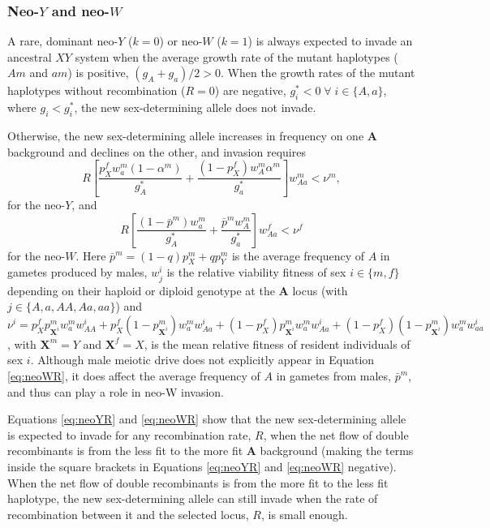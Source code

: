 \documentclass[12pt]{article}
\begin{document}
\subsubsection*{Neo-$Y$ and neo-$W$}

A rare, dominant neo-$Y$ ($k=0$) or neo-$W$ ($k=1$) is always expected to invade an ancestral $XY$ system when the average growth rate of the mutant haplotypes ($Am$ and $am$) is positive, $(g_A + g_a)/2 > 0$. %
When the growth rates of the mutant haplotypes without recombination ($R=0$) are negative, $g_i^* < 0 \; \forall \; i \in \{A,a\}$, where $g_i < g_i^*$, the new sex-determining allele does not invade.

Otherwise, the new sex-determining allele increases in frequency on one \textbf{A} background and declines on the other, and invasion requires
\begin{equation}\label{eq:neoYR}
R \left[ \frac{p^f_X w^m_a (1-\alpha^m)}{g_A^*} + \frac{(1 - p^f_X) w^m_A \alpha^m}{g_a^*} \right] w^m_{Aa} < \nu^m,
\end{equation}
for the neo-$Y$, and 
\begin{equation}\label{eq:neoWR}
R \left[  \frac{(1 - \bar{p}^m) w^m_{a}}{g_A^*} + \frac{\bar{p}^m w^m_{A}}{g_a^*} \right] w^f_{Aa} < \nu^f
\end{equation}
for the neo-$W$.
Here $\bar{p}^m = (1-q) p^m_X+ q p^m_Y$ is the average frequency of $A$ in gametes produced by males, $w^i_{j}$ is the relative viability fitness of sex $i\in\{m,f\}$ depending on their haploid or diploid genotype at the \textbf{A} locus (with $j\in\{A,a,AA,Aa,aa\}$) and
$\nu^i = 
  p^f_X p^m_{\textbf{X}^i} w^m_{a} w^i_{AA} +
  p^f_X (1-p^m_{\textbf{X}^i}) w^m_{a} w^i_{Aa} +
  (1-p^f_X) p^m_{\textbf{X}^i} w^m_{a} w^i_{Aa} +
  (1-p^f_X) (1-p^m_{\textbf{X}^i}) w^m_a w^i_{aa}$,
with $\textbf{X}^m = Y$ and $\textbf{X}^f = X$, is the mean relative fitness of resident individuals of sex $i$.
Although male meiotic drive does not explicitly appear in Equation \ref{eq:neoWR}, it does affect the average frequency of $A$ in gametes from males, $\bar{p}^m$, and thus can play a role in neo-W invasion.

Equations \eqref{eq:neoYR} and \eqref{eq:neoWR} show that the new sex-determining allele is expected to invade for any recombination rate, $R$, when the net flow of double recombinants is from the less fit to the more fit \textbf{A} background (making the terms inside the square brackets in Equations \ref{eq:neoYR} and \ref{eq:neoWR} negative).
When the net flow of double recombinants is from the more fit to the less fit haplotype, the new sex-determining allele can still invade when the rate of recombination between it and the selected locus, $R$, is small enough.
\end{document}
